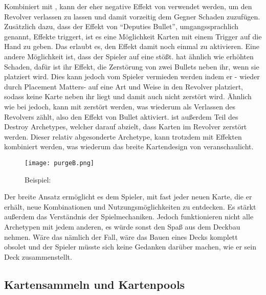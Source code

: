 Kombiniert mit , kann der eher negative Effekt von  verwendet werden, um
 den Revolver verlassen zu lassen und damit vorzeitig dem Gegner Schaden zuzufügen.
Zusätzlich dazu, dass der Effekt von “Deputies Bullet”, umgangssprachlich  genannt,  Effekte triggert,
ist es eine Möglichkeit Karten mit einem  Trigger auf die Hand zu geben. Das erlaubt es, den Effekt damit noch einmal zu aktivieren.
Eine andere Möglichkeit ist, dass der Spieler auf eine  stößt.  hat ähnlich wie 
erhöhten Schaden, dafür ist ihr Effekt, die Zerstörung von zwei Bullets neben ihr, wenn sie platziert wird.
Dies kann jedoch vom Spieler vermieden werden indem er - wieder durch Placement Matters-  auf eine Art und
Weise in den Revolver platziert, sodass keine Karte neben ihr liegt und damit auch nicht zerstört wird.
Ähnlich wie bei  jedoch, kann  mit  zerstört werden, was wiederum als
Verlassen des Revolvers zählt, also den Effekt von  Bullet aktiviert.  ist außerdem Teil
des Destroy Archetypes, welcher darauf abzielt, dass Karten im Revolver zerstört werden.
Dieser relativ abgesonderte Archetype, kann trotzdem mit  Effekten kombiniert werden, was wiederum das breite
Kartendesign von \FF veranschaulicht.

\begin{figure}[H]
    \centering
    \texttt{[image: purgeB.png]}
    \caption{Beispiel: }
\end{figure}


Der breite Ansatz ermöglicht es dem Spieler, mit fast jeder neuen Karte, die er erhält, neue Kombinationen und Nutzungsmöglichkeiten zu entdecken.
Es stärkt außerdem das Verständnis der Spielmechaniken.
Jedoch funktionieren nicht alle \FF Archetypen mit jedem anderen, es würde sonst den Spaß aus dem Deckbau nehmen.
Wäre das nämlich der Fall, wäre das Bauen eines Decks komplett obsolet und der Spieler müsste sich keine Gedanken darüber machen, wie er sein Deck zusammenstellt.



\subsection{Kartensammeln und Kartenpools}\label{subsec:placementMatters}

